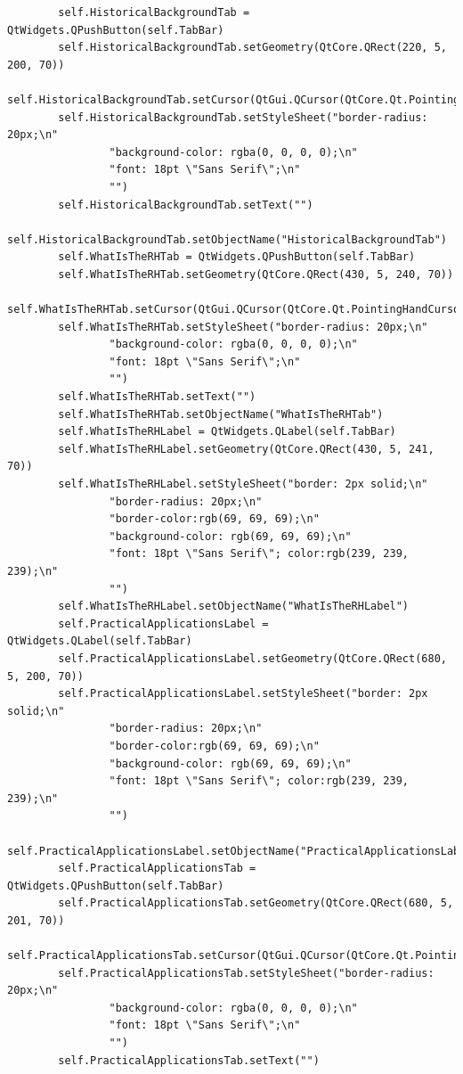 \documentclass[12pt]{article}
\begin{document}
\begin{lstlisting}
        self.HistoricalBackgroundTab = QtWidgets.QPushButton(self.TabBar)
        self.HistoricalBackgroundTab.setGeometry(QtCore.QRect(220, 5, 200, 70))
        self.HistoricalBackgroundTab.setCursor(QtGui.QCursor(QtCore.Qt.PointingHandCursor))
        self.HistoricalBackgroundTab.setStyleSheet("border-radius: 20px;\n"
                "background-color: rgba(0, 0, 0, 0);\n"
                "font: 18pt \"Sans Serif\";\n"
                "")
        self.HistoricalBackgroundTab.setText("")
        self.HistoricalBackgroundTab.setObjectName("HistoricalBackgroundTab")
        self.WhatIsTheRHTab = QtWidgets.QPushButton(self.TabBar)
        self.WhatIsTheRHTab.setGeometry(QtCore.QRect(430, 5, 240, 70))
        self.WhatIsTheRHTab.setCursor(QtGui.QCursor(QtCore.Qt.PointingHandCursor))
        self.WhatIsTheRHTab.setStyleSheet("border-radius: 20px;\n"
                "background-color: rgba(0, 0, 0, 0);\n"
                "font: 18pt \"Sans Serif\";\n"
                "")
        self.WhatIsTheRHTab.setText("")
        self.WhatIsTheRHTab.setObjectName("WhatIsTheRHTab")
        self.WhatIsTheRHLabel = QtWidgets.QLabel(self.TabBar)
        self.WhatIsTheRHLabel.setGeometry(QtCore.QRect(430, 5, 241, 70))
        self.WhatIsTheRHLabel.setStyleSheet("border: 2px solid;\n"
                "border-radius: 20px;\n"
                "border-color:rgb(69, 69, 69);\n"
                "background-color: rgb(69, 69, 69);\n"
                "font: 18pt \"Sans Serif\"; color:rgb(239, 239, 239);\n"
                "")
        self.WhatIsTheRHLabel.setObjectName("WhatIsTheRHLabel")
        self.PracticalApplicationsLabel = QtWidgets.QLabel(self.TabBar)
        self.PracticalApplicationsLabel.setGeometry(QtCore.QRect(680, 5, 200, 70))
        self.PracticalApplicationsLabel.setStyleSheet("border: 2px solid;\n"
                "border-radius: 20px;\n"
                "border-color:rgb(69, 69, 69);\n"
                "background-color: rgb(69, 69, 69);\n"
                "font: 18pt \"Sans Serif\"; color:rgb(239, 239, 239);\n"
                "")
        self.PracticalApplicationsLabel.setObjectName("PracticalApplicationsLabel")
        self.PracticalApplicationsTab = QtWidgets.QPushButton(self.TabBar)
        self.PracticalApplicationsTab.setGeometry(QtCore.QRect(680, 5, 201, 70))
        self.PracticalApplicationsTab.setCursor(QtGui.QCursor(QtCore.Qt.PointingHandCursor))
        self.PracticalApplicationsTab.setStyleSheet("border-radius: 20px;\n"
                "background-color: rgba(0, 0, 0, 0);\n"
                "font: 18pt \"Sans Serif\";\n"
                "")
        self.PracticalApplicationsTab.setText("")

\end{lstlisting}
\end{document}
